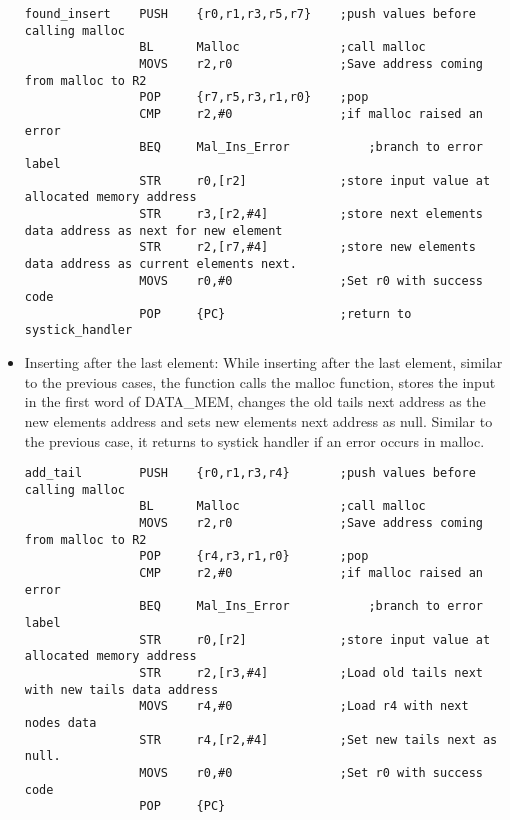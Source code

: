 \documentclass[pdftex,12pt,a4paper]{article}
\begin{document}
\begin{itemize}
\begin{lstlisting}[caption=Inserting in between the list, style=customasm]
found_insert	PUSH	{r0,r1,r3,r5,r7}	;push values before calling malloc
				BL		Malloc				;call malloc
				MOVS	r2,r0				;Save address coming from malloc to R2
				POP		{r7,r5,r3,r1,r0}	;pop
				CMP		r2,#0				;if malloc raised an error
				BEQ		Mal_Ins_Error			;branch to error label
				STR		r0,[r2]				;store input value at allocated memory address
				STR		r3,[r2,#4]			;store next elements data address as next for new element
				STR		r2,[r7,#4]			;store new elements data address as current elements next.
				MOVS	r0,#0				;Set r0 with success code
				POP		{PC}				;return to systick_handler
    \end{lstlisting}
    \newpage
    \item Inserting after the last element: While inserting after the last element, similar to the previous cases, the function calls the malloc function, stores the input in the first word of DATA\_MEM, changes the old tails next address as the new elements address and sets new elements next address as null. Similar to the previous case, it returns to systick handler if an error occurs in malloc.
    \begin{lstlisting}[caption=Inserting after the last element of the list, style=customasm]
    add_tail		PUSH	{r0,r1,r3,r4}		;push values before calling malloc
				BL		Malloc				;call malloc
				MOVS	r2,r0				;Save address coming from malloc to R2
				POP		{r4,r3,r1,r0}		;pop
				CMP		r2,#0				;if malloc raised an error
				BEQ		Mal_Ins_Error			;branch to error label
				STR		r0,[r2]				;store input value at allocated memory address	
				STR		r2,[r3,#4]			;Load old tails next with new tails data address
				MOVS	r4,#0				;Load r4 with next nodes data
				STR		r4,[r2,#4]			;Set new tails next as null.
				MOVS	r0,#0				;Set r0 with success code
				POP		{PC}
    \end{lstlisting}
\end{itemize}
\newpage
\end{document}
